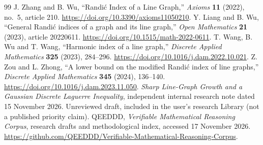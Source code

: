 \documentclass[11pt,a4paper]{article}
\theoremstyle{remark}
\begin{document}
\begin{thebibliography}{99}
 J. Zhang and B. Wu, ``Randi\'c Index of a Line Graph,'' \emph{Axioms} \textbf{11} (2022), no.~5, article 210. \url{https://doi.org/10.3390/axioms11050210}.
 Y. Liang and B. Wu, ``General Randi\'c indices of a graph and its line graph,'' \emph{Open Mathematics} \textbf{21} (2023), article 20220611. \url{https://doi.org/10.1515/math-2022-0611}.
 T. Wang, B. Wu and T. Wang, ``Harmonic index of a line graph,'' \emph{Discrete Applied Mathematics} \textbf{325} (2023), 284--296. \url{https://doi.org/10.1016/j.dam.2022.10.021}.
 Z. Zou and L. Zhong, ``A lower bound on the modified Randi\'c index of line graphs,'' \emph{Discrete Applied Mathematics} \textbf{345} (2024), 136--140. \url{https://doi.org/10.1016/j.dam.2023.11.050}.
 \emph{Sharp Line-Graph Growth and a Gaussian Discrete Laguerre Inequality}, independent internal research note dated 15 November 2026. Unreviewed draft, included in the user's research Library (not a published priority claim).
 QEEDDD, \emph{Verifiable Mathematical Reasoning Corpus}, research drafts and methodological index, accessed 17 November 2026. \url{https://github.com/QEEDDD/Verifiable-Mathematical-Reasoning-Corpus}.
\end{thebibliography}
\end{document}
